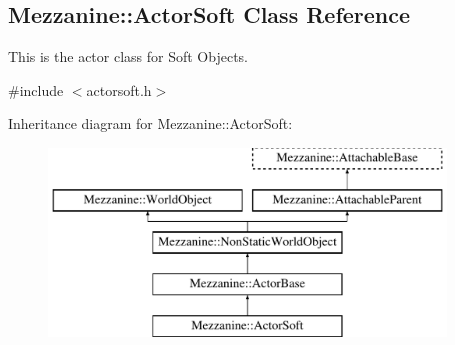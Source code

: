 \hypertarget{classMezzanine_1_1ActorSoft}{
\subsection{Mezzanine::ActorSoft Class Reference}
\label{classMezzanine_1_1ActorSoft}
}


This is the actor class for Soft Objects.  




{\ttfamily \#include $<$actorsoft.h$>$}

Inheritance diagram for Mezzanine::ActorSoft:\begin{figure}[H]
\begin{center}
\leavevmode
\includegraphics[height=5.000000cm]{classMezzanine_1_1ActorSoft}
\end{center}
\end{figure}
